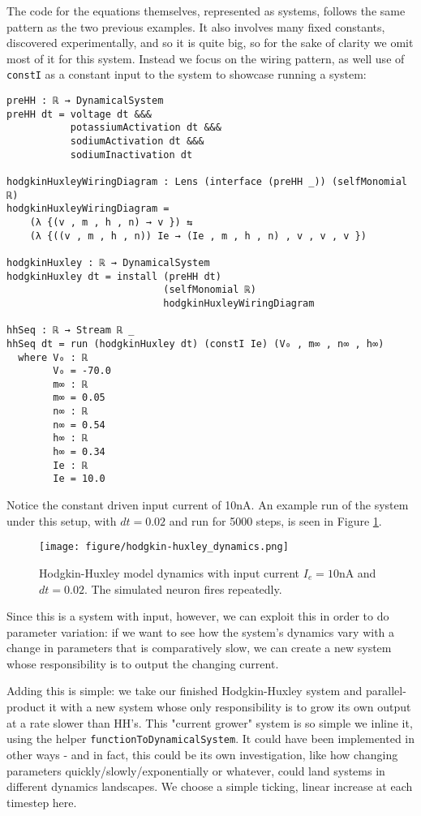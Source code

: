 The code for the equations themselves, represented as systems, follows the same pattern as the two previous examples. It also involves many fixed constants, discovered experimentally, and so it is quite big, so for the sake of clarity we omit most of it for this system. Instead we focus on the wiring pattern, as well use of \texttt{constI} as a constant input to the system to showcase running a system:
\begin{verbatim}
preHH : ℝ → DynamicalSystem
preHH dt = voltage dt &&& 
           potassiumActivation dt &&& 
           sodiumActivation dt &&&
           sodiumInactivation dt

hodgkinHuxleyWiringDiagram : Lens (interface (preHH _)) (selfMonomial ℝ)
hodgkinHuxleyWiringDiagram = 
    (λ {(v , m , h , n) → v }) ⇆ 
    (λ {((v , m , h , n)) Ie → (Ie , m , h , n) , v , v , v })

hodgkinHuxley : ℝ → DynamicalSystem
hodgkinHuxley dt = install (preHH dt)
                           (selfMonomial ℝ)
                           hodgkinHuxleyWiringDiagram

hhSeq : ℝ → Stream ℝ _
hhSeq dt = run (hodgkinHuxley dt) (constI Ie) (V₀ , m∞ , n∞ , h∞)
  where V₀ : ℝ
        V₀ = -70.0
        m∞ : ℝ
        m∞ = 0.05
        n∞ : ℝ
        n∞ = 0.54
        h∞ : ℝ
        h∞ = 0.34
        Ie : ℝ
        Ie = 10.0
\end{verbatim}

Notice the constant driven input current of 10nA. An example run of the system under this setup, with $dt = 0.02$ and run for 5000 steps, is seen in Figure \ref{fig:hhdynamics}.

\begin{figure}
    \centering
    \texttt{[image: figure/hodgkin-huxley\_dynamics.png]}
    \caption{Hodgkin-Huxley model dynamics with input current $I_e = 10$nA and $dt = 0.02$. The simulated neuron fires repeatedly.}
    \label{fig:hhdynamics}
\end{figure}

Since this is a system with input, however, we can exploit this in order to do parameter variation: if we want to see how the system's dynamics vary with a change in parameters that is comparatively slow, we can create a new system whose responsibility is to output the changing current.

Adding this is simple: we take our finished Hodgkin-Huxley system and parallel-product it with a new system whose only responsibility is to grow its own output at a rate slower than HH's. This "current grower" system is so simple we inline it, using the helper \texttt{functionToDynamicalSystem}. It could have been implemented in other ways - and in fact, this could be its own investigation, like how changing parameters quickly/slowly/exponentially or whatever, could land systems in different dynamics landscapes. We choose a simple ticking, linear increase at each timestep here.

